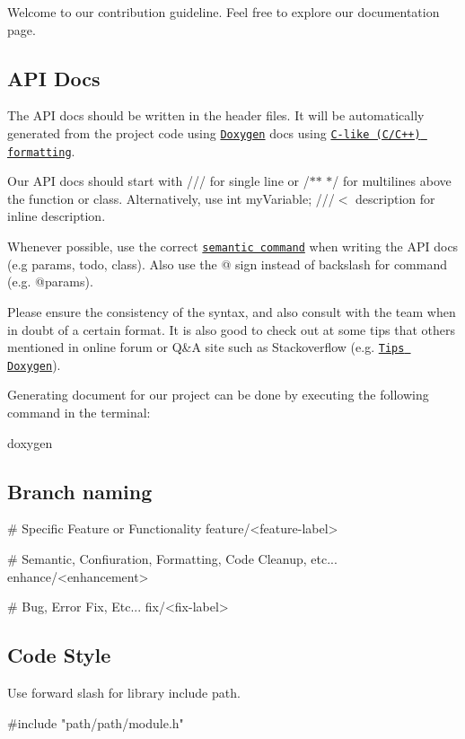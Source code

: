 Welcome to our contribution guideline. Feel free to explore our documentation page.

\subsection*{A\+P\+I Docs}

The A\+P\+I docs should be written in the header files. It will be automatically generated from the project code using \href{http://www.doxygen.org/}{\tt Doxygen} docs using \href{https://www.stack.nl/~dimitri/doxygen/manual/docblocks.html#cppblock}{\tt C-\/like (C/\+C++) formatting}.

Our A\+P\+I docs should start with {\ttfamily ///} for single line or {\ttfamily /$\ast$$\ast$} {\ttfamily $\ast$/} for multilines above the function or class. Alternatively, use {\ttfamily int my\+Variable; ///$<$ description} for inline description.

Whenever possible, use the correct \href{https://www.stack.nl/~dimitri/doxygen/manual/commands.html}{\tt semantic command} when writing the A\+P\+I docs (e.\+g {\ttfamily params}, {\ttfamily todo}, {\ttfamily class}). Also use the {\ttfamily @} sign instead of backslash for command (e.\+g. {\ttfamily @params}).

Please ensure the consistency of the syntax, and also consult with the team when in doubt of a certain format. It is also good to check out at some tips that others mentioned in online forum or Q\&A site such as Stackoverflow (e.\+g. \href{https://www.stack.nl/~dimitri/doxygen/manual/commands.html}{\tt Tips Doxygen}).

Generating document for our project can be done by executing the following command in the terminal\+: \begin{DoxyVerb}doxygen
\end{DoxyVerb}


\subsection*{Branch naming}

\begin{DoxyVerb}# Specific Feature or Functionality
feature/<feature-label>

# Semantic, Confiuration, Formatting, Code Cleanup, etc...
enhance/<enhancement>

# Bug, Error Fix, Etc...
fix/<fix-label>
\end{DoxyVerb}


\subsection*{Code Style}

Use forward slash for library include path. \begin{DoxyVerb}#include "path/path/module.h"\end{DoxyVerb}
 